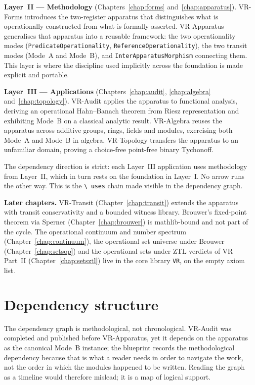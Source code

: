 \textbf{Layer~II --- Methodology} (Chapters~\ref{chap:forms}
and~\ref{chap:apparatus}).  VR-Forms introduces the two-register apparatus
that distinguishes what is operationally constructed from what is formally
asserted.  VR-Apparatus generalises that apparatus into a reusable
framework: the two operationality modes (\texttt{PredicateOperationality},
\texttt{ReferenceOperationality}), the two transit modes (Mode~A and
Mode~B), and \texttt{InterApparatusMorphism} connecting them.  This layer
is where the discipline used implicitly across the foundation is made
explicit and portable.

\textbf{Layer~III --- Applications} (Chapters~\ref{chap:audit},
\ref{chap:algebra} and~\ref{chap:topology}).  VR-Audit applies the
apparatus to functional analysis, deriving an operational Hahn--Banach
theorem from Riesz representation and exhibiting Mode~B on a classical
analytic result.  VR-Algebra reuses the apparatus across additive groups,
rings, fields and modules, exercising both Mode~A and Mode~B in algebra.
VR-Topology transfers the apparatus to an unfamiliar domain, proving a
choice-free point-free binary Tychonoff.

The dependency direction is strict: each Layer~III application uses
methodology from Layer~II, which in turn rests on the foundation in
Layer~I.  No arrow runs the other way.  This is the \texttt{\textbackslash
uses} chain made visible in the dependency graph.

\textbf{Later chapters.}  VR-Transit (Chapter~\ref{chap:transit}) extends
the apparatus with transit conservativity and a bounded witness library.
Brouwer's fixed-point theorem via Sperner (Chapter~\ref{chap:brouwer}) is
mathlib-bound and not part of the cycle.  The operational continuum and
number spectrum (Chapter~\ref{chap:continuum}), the operational set
universe under Brouwer (Chapter~\ref{chap:setsop}) and the operational sets
under ZTL verdicts of VR Part~II (Chapter~\ref{chap:setsztl}) live in the
core library \texttt{VR}, on the empty axiom list.

\section{Dependency structure}
\label{sec:overview_deps}

The dependency graph is methodological, not chronological.  VR-Audit was
completed and published before VR-Apparatus, yet it depends on the
apparatus as the canonical Mode~B instance; the blueprint records the
methodological dependency because that is what a reader needs in order to
navigate the work, not the order in which the modules happened to be
written.  Reading the graph as a timeline would therefore mislead; it is a
map of logical support.

